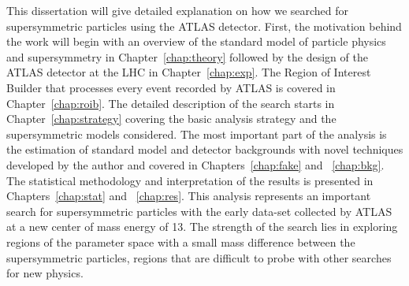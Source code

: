 This dissertation will give detailed explanation on how we searched for supersymmetric 
particles using the ATLAS detector.
First, the motivation behind the work will begin with an overview of the 
standard model of particle physics and supersymmetry in 
Chapter~\ref{chap:theory} followed by the design of the ATLAS detector 
at the LHC in Chapter~\ref{chap:exp}.
The Region of Interest Builder that processes every event recorded by ATLAS 
is covered in Chapter~\ref{chap:roib}.
The detailed description of the search starts in Chapter~\ref{chap:strategy}
covering the basic analysis strategy and the supersymmetric models considered.
The most important part of the analysis is the estimation of standard model and 
detector backgrounds with novel techniques developed by the author and covered in 
Chapters~\ref{chap:fake} and ~\ref{chap:bkg}. The statistical 
methodology and interpretation of the results is presented in 
Chapters~\ref{chap:stat} and ~\ref{chap:res}.
This analysis represents an important search for supersymmetric particles 
with the early data-set collected by ATLAS at a new center of mass energy of 13\TeV.
The strength of the search lies in exploring regions of the parameter space 
with a small mass difference between the supersymmetric particles, regions
that are difficult to probe with other searches for new physics.





